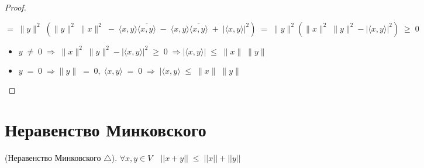 \begin{proof}
\begin{enumerate}
        $$= \; \|y\|^2 \; (\|y\|^2 \; \|x\|^2 \; - \; \langle x, y \rangle \overline{\langle x, y \rangle} \; - \; \langle x,y \rangle \overline{\langle x, y \rangle} \; + \; |\langle x, y \rangle|^2) \; = \; \|y\|^2(\|x\|^2 \; \|y\|^2 - |\langle x, y \rangle|^2) \; \geq \; 0$$
        
        
        \begin{itemize}
        
        \vspace{0.4cm} \item $y \; \neq \; 0 \; \Longrightarrow \; \|x\|^2 \; \|y\|^2 - |\langle x, y \rangle|^2 \; \geq \; 0 \; \Longrightarrow |\langle x, y \rangle| \; \leq \; \|x\| \; \|y\|$
        
        \vspace{0.4cm} \item $y \; = \; 0 \; \Longrightarrow \|y\| \; = \; 0, \; \langle x, y \rangle \; = \; 0 \; \Longrightarrow \; |\langle x, y \rangle \; \leq \; \|x\| \; \|y\|$
        \end{itemize}
    \end{enumerate}
\end{proof}

\clearpage
\section{Неравенство Минковского}
\begin{shth}
    \begin{theorem}
        (Неравенство Минковского $\triangle$).
        \newline
        $\forall x,y \in V \quad ||x + y|| \; \leq \; ||x|| + ||y||$
    \end{theorem}
\end{shth}


